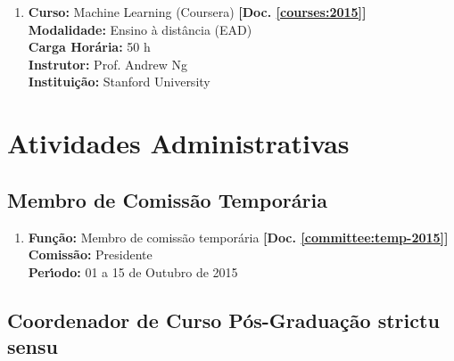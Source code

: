 \documentclass[a4paper,oneside,10pt]{article}
\begin{document}
\begin{enumerate}
\renewcommand{\labelenumi}{{\large\bfseries\arabic{enumi}.}}

\item   \textbf{Curso:}  Machine Learning (Coursera) \textbf{[Doc. \ref{courses:2015}]} \\
        \textbf{Modalidade:} Ensino \`{a} dist\^{a}ncia (EAD) \\
        \textbf{Carga Hor\'{a}ria:} 50 h  \\
        \textbf{Instrutor:} Prof. Andrew Ng \\
        \textbf{Institui\c{c}\~{a}o:} Stanford University

\end{enumerate}


\newpage
\section{Atividades Administrativas}
\vspace{0.3cm}


\subsection{Membro de Comiss\~{a}o Tempor\'{a}ria}
\vspace{0.3cm}

\begin{enumerate}
\renewcommand{\labelenumi}{{\large\bfseries\arabic{enumi}.}}


\item   \textbf{Fun\c{c}\~{a}o:} Membro de comissão temporária \textbf{[Doc. \ref{committee:temp-2015}]}\\
        \textbf{Comiss\~{a}o:} Presidente\\
        \textbf{Per\'{\i}odo:} 01 a 15 de Outubro de 2015

\end{enumerate}


\subsection{Coordenador de Curso Pós-Graduação \textbf{strictu sensu} }
\vspace{0.3cm}
\end{document}
